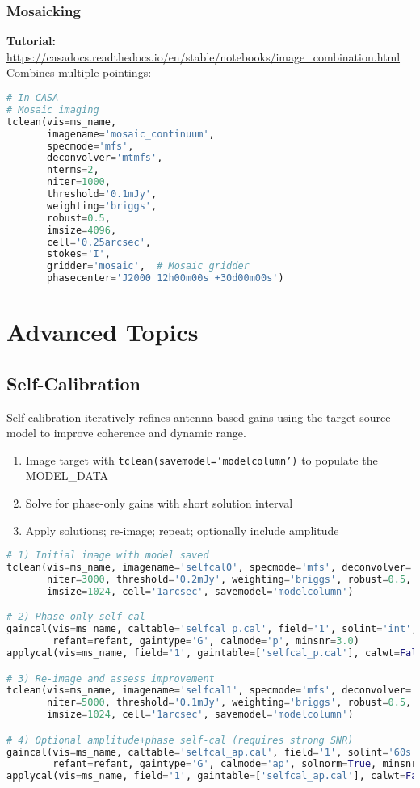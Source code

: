 \documentclass[11pt]{article}
\begin{document}
\subsubsection{Mosaicking}
\textbf{Tutorial:} \url{https://casadocs.readthedocs.io/en/stable/notebooks/image_combination.html}
Combines multiple pointings:

\begin{lstlisting}[language=Python]
# In CASA
# Mosaic imaging
tclean(vis=ms_name, 
       imagename='mosaic_continuum',
       specmode='mfs',
       deconvolver='mtmfs',
       nterms=2,
       niter=1000,
       threshold='0.1mJy',
       weighting='briggs',
       robust=0.5,
       imsize=4096,
       cell='0.25arcsec',
       stokes='I',
       gridder='mosaic',  # Mosaic gridder
       phasecenter='J2000 12h00m00s +30d00m00s')
\end{lstlisting}

\section{Advanced Topics}

\subsection{Self-Calibration}
Self-calibration iteratively refines antenna-based gains using the target source model to improve coherence and dynamic range.
\begin{enumerate}
    \item Image target with \texttt{tclean(savemodel='modelcolumn')} to populate the MODEL\_DATA
    \item Solve for phase-only gains with short solution interval
    \item Apply solutions; re-image; repeat; optionally include amplitude
\end{enumerate}
\begin{lstlisting}[language=Python]
# 1) Initial image with model saved
tclean(vis=ms_name, imagename='selfcal0', specmode='mfs', deconvolver='hogbom',
       niter=3000, threshold='0.2mJy', weighting='briggs', robust=0.5,
       imsize=1024, cell='1arcsec', savemodel='modelcolumn')

# 2) Phase-only self-cal
gaincal(vis=ms_name, caltable='selfcal_p.cal', field='1', solint='int',
        refant=refant, gaintype='G', calmode='p', minsnr=3.0)
applycal(vis=ms_name, field='1', gaintable=['selfcal_p.cal'], calwt=False)

# 3) Re-image and assess improvement
tclean(vis=ms_name, imagename='selfcal1', specmode='mfs', deconvolver='hogbom',
       niter=5000, threshold='0.1mJy', weighting='briggs', robust=0.5,
       imsize=1024, cell='1arcsec', savemodel='modelcolumn')

# 4) Optional amplitude+phase self-cal (requires strong SNR)
gaincal(vis=ms_name, caltable='selfcal_ap.cal', field='1', solint='60s',
        refant=refant, gaintype='G', calmode='ap', solnorm=True, minsnr=5.0)
applycal(vis=ms_name, field='1', gaintable=['selfcal_ap.cal'], calwt=False)
\end{lstlisting}
\end{document}
